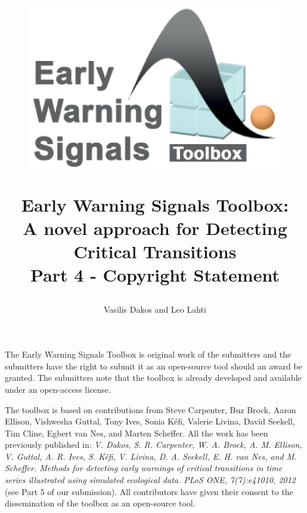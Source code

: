 \documentclass[12pt,a4paper,final]{article}
\author{Vasilis Dakos and Leo Lahti}
\title{
\begin{figure}[h]
\includegraphics[scale=0.55]{logoEWS.eps}
\end{figure}
Early Warning Signals Toolbox:\\ 
A novel approach for Detecting Critical Transitions\\
Part 4 - Copyright Statement
}
\begin{document}
\maketitle

\begin{doublespacing}

The Early Warning Signals Toolbox is original work of the submitters
and the submitters have the right to submit it as an open-source tool should an award be granted. The submitters note that the toolbox is already developed and available under an open-access license.

The toolbox is based on contributions from Steve Carpenter, Buz Brock, Aaron Ellison, Vishwesha Guttal, Tony Ives, Sonia K\'{e}fi, Valerie Livina, David Seekell, Tim Cline, Egbert van Nes, and Marten Scheffer. All the work has been previously published in: \textit{V. Dakos, S. R. Carpenter, W. A. Brock, A. M. Ellison, V. Guttal, A. R. Ives, S. K\'{e}fi, V. Livina, D. A. Seekell, E. H. van Nes, and M. Scheffer. Methods for detecting early warnings of critical transitions in time series illustrated using simulated ecological data. PLoS ONE, 7(7):e41010, 2012} (see Part 5 of our submission).
All contributors have given their consent to the dissemination of the toolbox as an open-source tool.

\end{doublespacing}
\end{document}
